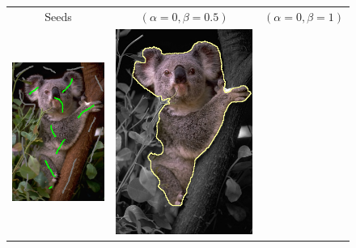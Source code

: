 \documentclass[smallextended]{svjour3}       %
\begin{document}
{{\begin{figure}[ht!]
\center
\begin{tabular}{ccc}
Seeds & $(\alpha=0, \beta=0.5)$ & $(\alpha=0,\beta=1)$ \\
 	\includegraphics[scale=0.25]{images/segmentation/bc/coala/seeds.png} & 
	\includegraphics[scale=0.25]{images/segmentation/bc/coala/r3/lg0_sq05_dt1_it50.png} & 

\end{tabular}
\end{figure}}}
\end{document}
